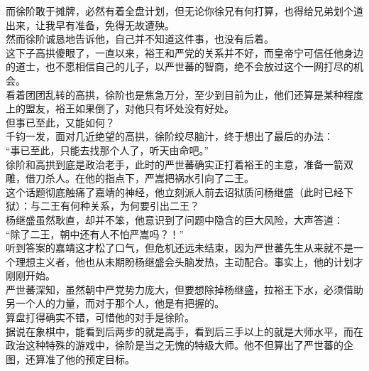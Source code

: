 \begin{multicols}{\theparacolNo}
而徐阶敢于摊牌，必然有着全盘计划，但无论你徐兄有何打算，也得给兄弟划个道出来，让我早有准备，免得无故遭殃。\\

然而徐阶诚恳地告诉他，自己并不知道这件事，也没有后着。\\

这下子高拱傻眼了，一直以来，裕王和严党的关系并不好，而皇帝宁可信任他身边的道士，也不愿相信自己的儿子，以严世蕃的智商，绝不会放过这个一网打尽的机会。\\

看着团团乱转的高拱，徐阶也是焦急万分，至少到目前为止，他们还算是某种程度上的盟友，裕王如果倒了，对他只有坏处没有好处。\\

但事已至此，又能如何？\\

千钧一发，面对几近绝望的高拱，徐阶绞尽脑汁，终于想出了最后的办法：\\

“事已至此，只能去找那个人了，听天由命吧。”\\

徐阶和高拱到底是政治老手，此时的严世蕃确实正打着裕王的主意，准备一箭双雕，借刀杀人。在他的指点下，严嵩把祸水引向了二王。\\

这个话题彻底触痛了嘉靖的神经，他立刻派人前去诏狱质问杨继盛（此时已经下狱）：与二王有何种关系，为何要引出二王？\\

杨继盛虽然耿直，却并不笨，他意识到了问题中隐含的巨大风险，大声答道：\\

“除了二王，朝中还有人不怕严嵩吗？！”\\

听到答案的嘉靖这才松了口气，但危机还远未结束，因为严世蕃先生从来就不是一个理想主义者，他也从未期盼杨继盛会头脑发热，主动配合。事实上，他的计划才刚刚开始。\\

严世蕃深知，虽然朝中严党势力庞大，但要想除掉杨继盛，拉裕王下水，必须借助另一个人的力量，而对于那个人，他是有把握的。\\

算盘打得确实不错，可惜他的对手是徐阶。\\

据说在象棋中，能看到后两步的就是高手，看到后三手以上的就是大师水平，而在政治这种特殊的游戏中，徐阶是当之无愧的特级大师。他不但算出了严世蕃的企图，还算准了他的预定目标。\\


\end{multicols}
